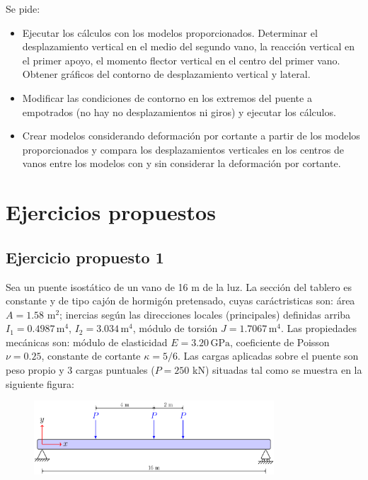 \documentclass[a4paper,12pt]{article}
\begin{document}
Se pide:
\begin{itemize}
\item Ejecutar los cálculos con los modelos proporcionados. Determinar el desplazamiento vertical en el medio del segundo vano, la reacción vertical en el primer apoyo, el momento flector vertical en el centro del primer vano. Obtener gráficos del contorno de desplazamiento vertical y lateral.
\item Modificar las condiciones de contorno en los extremos del puente a empotrados (no hay no desplazamientos ni giros) y ejecutar los cálculos.
\item Crear modelos considerando deformación por cortante a partir de los modelos proporcionados y compara los desplazamientos verticales en los centros de vanos entre los modelos con y sin considerar la deformación por cortante.
\end{itemize}

\clearpage
\section*{Ejercicios propuestos}
\subsection*{Ejercicio propuesto 1}
Sea un puente isostático de un vano de 16 m de la luz. La sección del tablero es constante y de tipo cajón de hormigón pretensado, cuyas caráctristicas son: área $A=1.58$ m$^2$; inercias según las direcciones locales (principales) definidas arriba  $I_{1}=0.4987\,\text{m}^{4}$, $I_{2}=3.034\,\text{m}^{4}$, módulo de torsión $J=1.7067\,\text{m}^{4}$. 
Las propiedades mecánicas son: módulo de elasticidad $E=3.20\,\text{GPa}$,  coeficiente de Poisson $\nu=0.25$,  constante de cortante $\kappa=5/6$. 
Las cargas aplicadas sobre el puente son peso propio y 3 cargas puntuales ($P=250$ kN) situadas tal como se muestra en la siguiente figura:

\begin{figure}[h]
\centering
\includegraphics[width=0.8\textwidth]{figs/croquis1.pdf}
\label{fig.eje1}
\end{figure}
\end{document}
